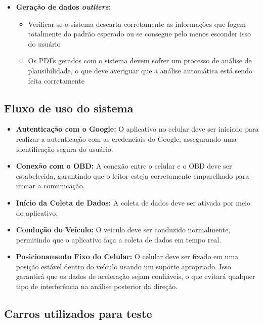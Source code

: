 \begin{itemize}
    \item \textbf{Geração de dados \textit{outliers}:}
    \begin{itemize}
        \item Verificar se o sistema descarta corretamente as informações que fogem totalmente do padrão esperado ou se consegue pelo menos esconder isso do usuário
        \item Os PDFs gerados com o sistema devem sofrer um processo de análise de plausibilidade, o que deve averiguar que a análise automática está sendo feita corretamente
    \end{itemize}
    
\end{itemize}


\subsection{Fluxo de uso do sistema}

    \begin{itemize}
    \item \textbf{Autenticação com o Google:}
    O aplicativo no celular deve ser iniciado para realizar a autenticação com as credenciais do Google, assegurando uma identificação segura do usuário.

    \item \textbf{Conexão com o OBD:}
    A conexão entre o celular e o OBD deve ser estabelecida, garantindo que o leitor esteja corretamente emparelhado para iniciar a comunicação.

    \item \textbf{Início da Coleta de Dados:}
    A coleta de dados deve ser ativada por meio do aplicativo.

    \item \textbf{Condução do Veículo:}
    O veículo deve ser conduzido normalmente, permitindo que o aplicativo faça a coleta de dados em tempo real.

    \item \textbf{Posicionamento Fixo do Celular:}
    O celular deve ser fixado em uma posição estável dentro do veículo usando um suporte apropriado. Isso garantirá que os dados de aceleração sejam confiáveis, o que evitará qualquer tipo de interferência na análise posterior da direção.
\end{itemize}


\subsection{Carros utilizados para teste}

